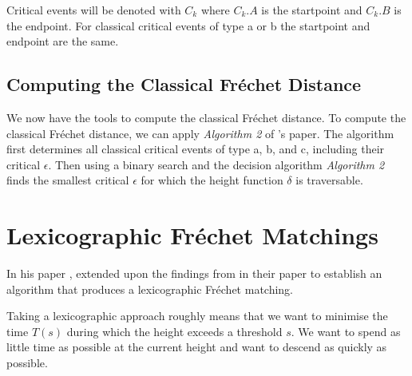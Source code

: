 \addtocounter{footnote}{-3} %

Critical events will be denoted with $C_k$ where $C_k.A$ is the startpoint and $C_k.B$ is the endpoint. For classical critical events of type a or b the startpoint and endpoint are the same.


\subsection{Computing the Classical Fréchet Distance}

We now have the tools to compute the classical Fréchet distance. To compute the classical Fréchet distance, we can apply \textit{Algorithm 2} of \citeauthor*{altgodau}'s paper.\cite{altgodau} The algorithm first determines all classical critical events of type a, b, and c, including their critical $\epsilon$. Then using a binary search and the decision algorithm \textit{Algorithm 2} finds the smallest critical $\epsilon$ for which the height function $\delta$ is traversable.


\section{Lexicographic Fréchet Matchings}

In his \citeyear{rotelex} paper , \citeauthor{rotelex} extended upon the findings from \citeauthor*{altgodau} in their paper  to establish an algorithm that produces a lexicographic Fréchet matching.

Taking a lexicographic approach roughly means that we want to minimise the time $T(s)$ during which the height exceeds a threshold $s$.\cite{rotelex} We want to spend as little time as possible at the current height and want to descend as quickly as possible.

